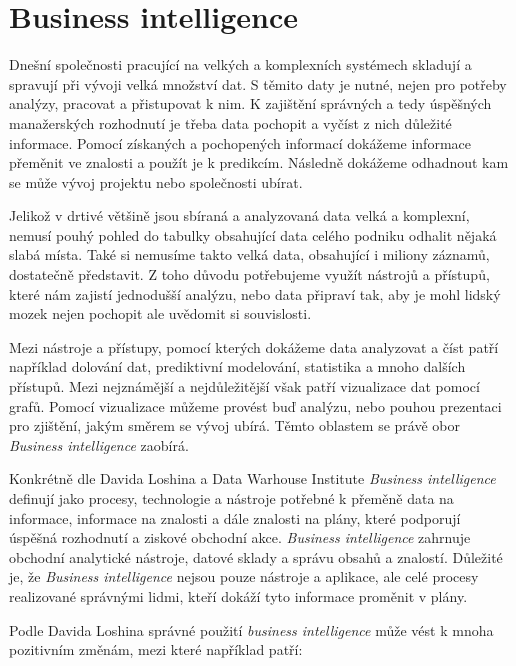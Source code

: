 \documentclass[czech,master,public,dept460,male,cpdeclaration,oneside]{diploma}
\begin{document}
\newpage %
\section{Business intelligence}
Dnešní společnosti pracující na velkých a komplexních systémech skladují a spravují při vývoji velká množství dat. S těmito daty je nutné, nejen pro potřeby analýzy, pracovat a přistupovat k nim. K zajištění správných a tedy úspěšných manažerských rozhodnutí je třeba data pochopit a vyčíst z nich důležité informace. Pomocí získaných a pochopených informací dokážeme informace přeměnit ve znalosti a použít je k predikcím. Následně dokážeme odhadnout kam se může vývoj projektu nebo společnosti ubírat.

Jelikož v drtivé většině jsou sbíraná a analyzovaná data velká a komplexní, nemusí pouhý pohled do tabulky obsahující data celého podniku odhalit nějaká slabá místa. Také si nemusíme takto velká data, obsahující i miliony záznamů, dostatečně představit. Z toho důvodu potřebujeme využít nástrojů a přístupů, které nám zajistí jednodušší analýzu, nebo data připraví tak, aby je mohl lidský mozek nejen pochopit ale uvědomit si souvislosti.

Mezi nástroje a přístupy, pomocí kterých dokážeme data analyzovat a číst patří například dolování dat, prediktivní modelování, statistika a mnoho dalších přístupů. Mezi nejznámější a nejdůležitější však patří vizualizace dat pomocí grafů. Pomocí vizualizace můžeme provést buď analýzu, nebo pouhou prezentaci pro zjištění, jakým směrem se vývoj ubírá. Těmto oblastem se právě obor \textit{Business intelligence} zaobírá.

Konkrétně dle Davida Loshina \cite{ref:bi_loshin_david} a Data Warhouse Institute \textit{Business intelligence} definují jako procesy, technologie a nástroje potřebné k přeměně data na informace, informace na znalosti a dále znalosti na plány, které podporují úspěšná rozhodnutí a ziskové obchodní akce. \textit{Business intelligence} zahrnuje obchodní analytické nástroje, datové sklady a správu obsahů a znalostí. Důležité je, že \textit{Business intelligence} nejsou pouze nástroje a aplikace, ale celé procesy realizované správnými lidmi, kteří dokáží tyto informace proměnit v plány.

Podle Davida Loshina \cite{ref:bi_loshin_david} správné použití \textit{business intelligence} může vést k mnoha pozitivním změnám, mezi které například patří:
\end{document}
